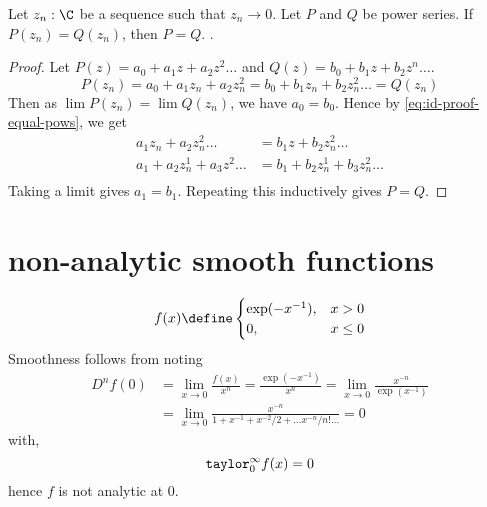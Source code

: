 \documentclass[10pt]{scrartcl}
\numberwithin{thms}{section}
\begin{document}
\begin{theorem}
  Let $z_n:\C$ be a sequence such that $z_n\to 0$. Let $P$ and $Q$ be power series. If $P(z_n)=Q(z_n)$, then $P=Q$. 
  \cite{needham:visual-complex}. 
\end{theorem}
\begin{proof}
  Let $P(z)=a_0+a_1z+a_2z^2\dots$ and $Q(z)=b_0+b_1z+b_2z^n\dots$.
  \begin{equation}
    \label{eq:id-proof-equal-pows}
    P(z_n)=a_0+a_1z_n+a_2z_n^2=b_0+b_1z_n+b_2z_n^2\dots = Q(z_n)
  \end{equation}
  Then as $\lim P(z_n)=\lim Q(z_n)$, we have $a_0=b_0$. Hence by \cref{eq:id-proof-equal-pows}, we get
  \begin{align*}
    a_1z_n+a_2z_n^2\dots &= b_1z+b_2z_n^2\dots\\
    a_1+a_2z_n^1+a_3z^2\dots &= b_1+b_2z_n^1+b_3z_n^2\dots\\
  \end{align*}
  Taking a limit gives $a_1=b_1$. Repeating this inductively gives $P=Q$. 
\end{proof}

\section{non-analytic smooth functions}
\begin{counterex}
  \[
  f(x)\define
  \begin{cases}
    \exp(-x^{-1}),&x>0\\
    0,&x\leq 0
  \end{cases}
  \]
  Smoothness follows from noting
  \begin{align*}
    D^nf(0)&=\lim_{x\to 0}\frac{f(x)}{x^n}=\frac{\exp(-x^{-1})}{x^n}=\lim_{x\to 0}\frac{x^{-n}}{\exp(x^{-1})}\\
           &=\lim_{x\to 0}\frac{x^{-n}}{1+x^{-1}+x^{-2}/2+\dots x^{-n}/n!\dots}=0
  \end{align*}
  with, 
  \[
  \mathtt{taylor}_0^\infty f(x)=0
  \]
  hence $f$ is not analytic at $0$. 
  \cite{wiki:smooth-non-analytic}
\end{counterex}


\printbibliography
\end{document}
